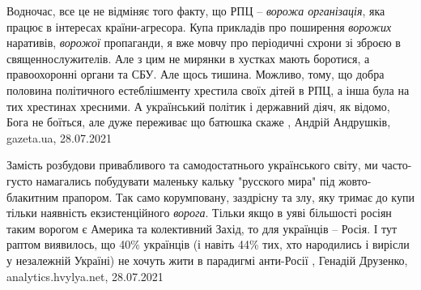 Водночас, все це не відміняє того факту, що РПЦ – \emph{ворожа організація}, яка
працює в інтересах країни-агресора. Купа прикладів про поширення \emph{ворожих}
наративів, \emph{ворожої} пропаганди, я вже мовчу про періодичні схрони зі зброєю в
священнослужителів. Але з цим не мирянки в хустках мають боротися, а
правоохоронні органи та СБУ. Але щось тишина. Можливо, тому, що добра половина
політичного естеблішменту хрестила своїх дітей в РПЦ, а інша була на тих
хрестинах хресними. А український політик і державний діяч, як відомо, Бога не
боїться, але дуже переживає що батюшка скаже
, 
Андрій Андрушків, gazeta.ua, 28.07.2021

Замість розбудови привабливого та самодостатнього українського світу, ми
часто-густо намагались побудувати маленьку кальку "русского мира" під
жовто-блакитним прапором. Так само корумповану, заздрісну та злу, яку тримає до
купи тільки наявність екзистенційного \emph{ворога}. Тільки якщо в уяві більшості
росіян таким ворогом є Америка та колективний Захід, то для українців – Росія.
І тут раптом виявилось, що 40\% українців (і навіть 44\% тих, хто народились і
вирісли у незалежній Україні) не хочуть жити в парадигмі анти-Росії
, 
Генадій Друзенко, analytics.hvylya.net, 28.07.2021

